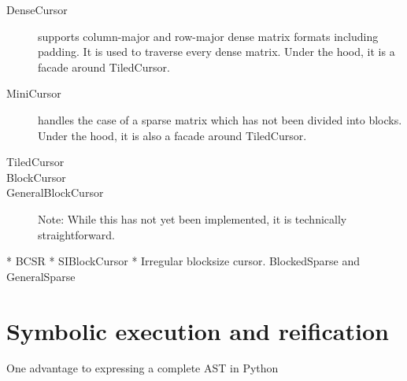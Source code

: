     \begin{description}
        \item[DenseCursor] supports column-major and row-major dense matrix formats including padding. It is used to traverse every dense matrix. Under the hood, it is a facade around TiledCursor.

        \item[MiniCursor] handles the case of a sparse matrix which has not been divided into blocks. Under the hood, it is also a facade around TiledCursor.

        \item[TiledCursor] 

        \item[BlockCursor]
        \item[GeneralBlockCursor] Note: While this has not yet been implemented, it is technically straightforward.
    \end{description}

    * BCSR
    * SIBlockCursor
    * Irregular blocksize cursor. BlockedSparse and GeneralSparse

\section{Symbolic execution and reification}

One advantage to expressing a complete AST in Python
